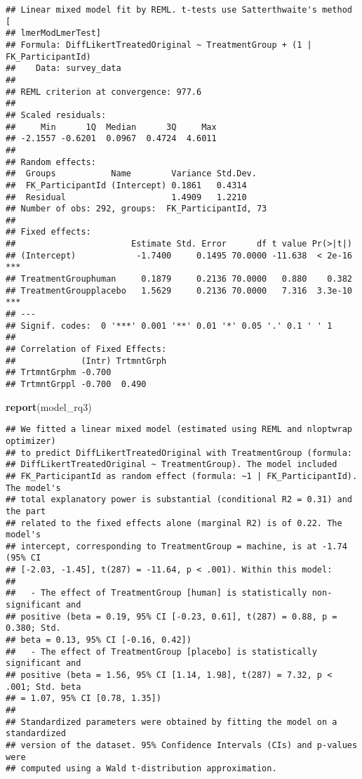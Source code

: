\documentclass[
]{article}
\newenvironment{Shaded}{\begin{snugshade}}{\end{snugshade}}
\newcommand{\FunctionTok}[1]{\textcolor[rgb]{0.13,0.29,0.53}{\textbf{#1}}}
\newcommand{\NormalTok}[1]{#1}
\begin{document}
\begin{verbatim}
## Linear mixed model fit by REML. t-tests use Satterthwaite's method [
## lmerModLmerTest]
## Formula: DiffLikertTreatedOriginal ~ TreatmentGroup + (1 | FK_ParticipantId)
##    Data: survey_data
## 
## REML criterion at convergence: 977.6
## 
## Scaled residuals: 
##     Min      1Q  Median      3Q     Max 
## -2.1557 -0.6201  0.0967  0.4724  4.6011 
## 
## Random effects:
##  Groups           Name        Variance Std.Dev.
##  FK_ParticipantId (Intercept) 0.1861   0.4314  
##  Residual                     1.4909   1.2210  
## Number of obs: 292, groups:  FK_ParticipantId, 73
## 
## Fixed effects:
##                       Estimate Std. Error      df t value Pr(>|t|)    
## (Intercept)            -1.7400     0.1495 70.0000 -11.638  < 2e-16 ***
## TreatmentGrouphuman     0.1879     0.2136 70.0000   0.880    0.382    
## TreatmentGroupplacebo   1.5629     0.2136 70.0000   7.316  3.3e-10 ***
## ---
## Signif. codes:  0 '***' 0.001 '**' 0.01 '*' 0.05 '.' 0.1 ' ' 1
## 
## Correlation of Fixed Effects:
##             (Intr) TrtmntGrph
## TrtmntGrphm -0.700           
## TrtmntGrppl -0.700  0.490
\end{verbatim}

\begin{Shaded}
\begin{Highlighting}[]
\FunctionTok{report}\NormalTok{(model\_rq3)}
\end{Highlighting}
\end{Shaded}

\begin{verbatim}
## We fitted a linear mixed model (estimated using REML and nloptwrap optimizer)
## to predict DiffLikertTreatedOriginal with TreatmentGroup (formula:
## DiffLikertTreatedOriginal ~ TreatmentGroup). The model included
## FK_ParticipantId as random effect (formula: ~1 | FK_ParticipantId). The model's
## total explanatory power is substantial (conditional R2 = 0.31) and the part
## related to the fixed effects alone (marginal R2) is of 0.22. The model's
## intercept, corresponding to TreatmentGroup = machine, is at -1.74 (95% CI
## [-2.03, -1.45], t(287) = -11.64, p < .001). Within this model:
## 
##   - The effect of TreatmentGroup [human] is statistically non-significant and
## positive (beta = 0.19, 95% CI [-0.23, 0.61], t(287) = 0.88, p = 0.380; Std.
## beta = 0.13, 95% CI [-0.16, 0.42])
##   - The effect of TreatmentGroup [placebo] is statistically significant and
## positive (beta = 1.56, 95% CI [1.14, 1.98], t(287) = 7.32, p < .001; Std. beta
## = 1.07, 95% CI [0.78, 1.35])
## 
## Standardized parameters were obtained by fitting the model on a standardized
## version of the dataset. 95% Confidence Intervals (CIs) and p-values were
## computed using a Wald t-distribution approximation.
\end{verbatim}
\end{document}

